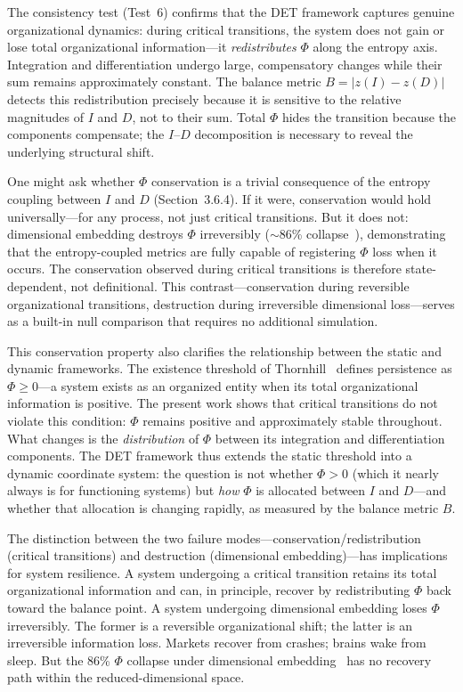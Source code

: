 \documentclass[12pt,a4paper]{article}
\begin{document}
The consistency test (Test~6) confirms that the DET framework captures genuine organizational dynamics: during critical transitions, the system does not gain or lose total organizational information---it \emph{redistributes} $\Phi$ along the entropy axis. Integration and differentiation undergo large, compensatory changes while their sum remains approximately constant. The balance metric $B = |z(I) - z(D)|$ detects this redistribution precisely because it is sensitive to the relative magnitudes of $I$ and $D$, not to their sum. Total $\Phi$ hides the transition because the components compensate; the $I$--$D$ decomposition is necessary to reveal the underlying structural shift.

One might ask whether $\Phi$ conservation is a trivial consequence of the entropy coupling between $I$ and $D$ (Section~3.6.4). If it were, conservation would hold universally---for any process, not just critical transitions. But it does not: dimensional embedding destroys $\Phi$ irreversibly (${\sim}86$\% collapse~\cite{thornhill2026b,thornhill2026c}), demonstrating that the entropy-coupled metrics are fully capable of registering $\Phi$ loss when it occurs. The conservation observed during critical transitions is therefore state-dependent, not definitional. This contrast---conservation during reversible organizational transitions, destruction during irreversible dimensional loss---serves as a built-in null comparison that requires no additional simulation.

This conservation property also clarifies the relationship between the static and dynamic frameworks. The existence threshold of Thornhill~\cite{thornhill2026a} defines persistence as $\Phi \geq 0$---a system exists as an organized entity when its total organizational information is positive. The present work shows that critical transitions do not violate this condition: $\Phi$ remains positive and approximately stable throughout. What changes is the \emph{distribution} of $\Phi$ between its integration and differentiation components. The DET framework thus extends the static threshold into a dynamic coordinate system: the question is not whether $\Phi > 0$ (which it nearly always is for functioning systems) but \emph{how} $\Phi$ is allocated between $I$ and $D$---and whether that allocation is changing rapidly, as measured by the balance metric $B$.

The distinction between the two failure modes---conservation/redistribution (critical transitions) and destruction (dimensional embedding)---has implications for system resilience. A system undergoing a critical transition retains its total organizational information and can, in principle, recover by redistributing $\Phi$ back toward the balance point. A system undergoing dimensional embedding loses $\Phi$ irreversibly. The former is a reversible organizational shift; the latter is an irreversible information loss. Markets recover from crashes; brains wake from sleep. But the 86\% $\Phi$ collapse under dimensional embedding~\cite{thornhill2026b,thornhill2026c} has no recovery path within the reduced-dimensional space.
\end{document}

